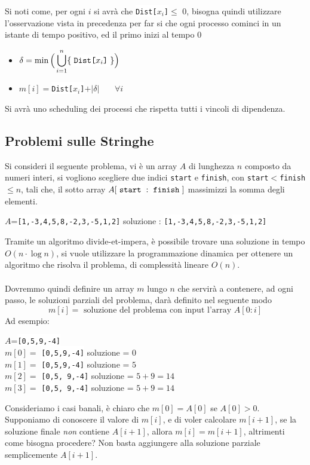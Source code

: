 \documentclass[12pt, letterpaper]{article}
\newcommand{\codeee}[1]{\colorbox{lg}{\texttt{#1}}}
\newcommand{\codee}[1]{\colorbox{white}{\texttt{#1}}}
\newcommand{\acc}{\\\hphantom{}\\}
\begin{document}
Si noti come, per ogni $i$ si avrà che \codee{Dist[$x_i$]}$\le$ 0, bisogna quindi utilizzare l'osservazione vista in precedenza per far 
si che ogni processo cominci in un istante di tempo positivo, ed il primo inizi al tempo 0\begin{itemize}
    \item $\delta = \min\Big(\displaystyle\bigcup_{i=1}^n\{\text{\codee{Dist[$x_i$]}}\}\Big)$
    \item $m[i]=$\codee{Dist[$x_i$]}$+|\delta|\;\;\;\;\,\;\;\forall i$
\end{itemize}
Si avrà uno scheduling dei processi che rispetta tutti i vincoli di dipendenza.
\subsection{Problemi sulle Stringhe}
Si consideri il seguente problema, vi è un array $A$ di lunghezza $n$ composto da numeri interi, si vogliono scegliere 
due indici \codee{start} e \codee{finish}, con \codee{start}$<$\codee{finish}$\le n$, tali che, il sotto 
array $A[\codee{start}:\codee{finish}]$ massimizzi la somma degli elementi. \begin{center}
    $A$=\codee{[1,-3,4,5,8,-2,3,-5,1,2]} soluzione : \codee{[1,-3,}\codeee{4,5,8,-2,3}\codee{,-5,1,2]}
\end{center}
Tramite un algoritmo divide-et-impera, è possibile trovare una soluzione in tempo $O(n\cdot\log{n})$, si vuole utilizzare 
la programmazione dinamica per ottenere un algoritmo che risolva il problema, di complessità lineare $O(n)$.\acc 
Dovremmo quindi definire un array $m$ lungo $n$ che servirà a contenere, ad ogni passo, le soluzioni parziali del problema, 
darà definito nel seguente modo $$m[i]=\text{ soluzione del problema con input l'array }A[0:i]$$
Ad esempio:\begin{center}
    $A$=\codee{[0,5,9,-4]}  \\ $m[0]=$ \codee{[0,5,9,-4]} soluzione = $0$ 
    \\ $m[1]=$ \codee{[0,}\codeee{5,}\codee{9,-4]} soluzione = $5$ \\  $m[2]=$ \codee{[0,}\codeee{5,  9}\codee{,-4]} soluzione = $5+9=14$ 
    \\ $m[3]=$ \codee{[0,}\codeee{5,  9}\codee{,-4]} soluzione = $5+9=14$
\end{center}
Consideriamo i casi banali, è chiaro che $m[0]=A[0]$ se $A[0]>0$. Supponiamo di conoscere il valore di $m[i]$, e di voler 
calcolare $m[i+1]$, se la soluzione finale \textit{non} contiene $A[i+1]$, allora $m[i]=m[i+1]$, altrimenti come bisogna 
procedere? Non basta aggiungere alla soluzione parziale semplicemente $A[i+1]$.
\end{document}
